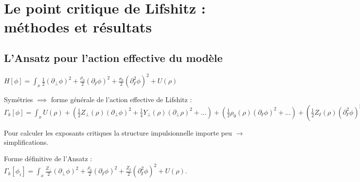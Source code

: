 \documentclass[xcolor=dvipsnames]{beamer}
\newcommand{\p}[1]{\partial_{#1}}
\begin{document}
\section{Le point critique de Lifshitz : méthodes et résultats}
\subsection{L'Ansatz pour l'action effective du modèle}
\begin{frame}

\centering
$ H[\phi] = \int_x  \frac{1}{2}(\p{\perp} \phi)^2 + \frac{\rho_0}{2}(\p{\sslash} \phi)^2 + \frac{\sigma_0}{2} (\p{\sslash}^2 \phi)^2 + U(\rho)$

\begin{block}{Symétries $\implies$ forme générale de l'action effective de Lifshitz :}
$\Gamma_k[\phi] = \int_{x} U(\rho) + \left( \frac{1}{2} Z_\perp(\rho) (\partial_\perp \phi)^2 + \frac{1}{4} Y_\perp(\rho) (\partial_\perp \rho)^2 + ... \right) + \left( \frac{1}{2} \rho_0(\rho) (\partial_\sslash \phi)^2 + ... \right) + \left( \frac{1}{2} Z_\sslash(\rho) (\partial_\sslash^2 \phi)^2 + ... \right)$
\end{block}

Pour calculer les exposants critiques la structure impulsionnelle importe peu $\rightarrow$ simplifications.

\begin{block}{Forme définitive de l'Ansatz :}
$\Gamma_k[\phi_i] = \int_x  \frac{Z_\perp}{2} (\partial_\perp \phi)^2 + \frac{\rho_0}{2} (\partial_\sslash \phi)^2 + \frac{Z_\sslash}{2} (\partial_\sslash^2 \phi)^2 + U(\rho).$
\end{block}
\end{frame}
\end{document}
